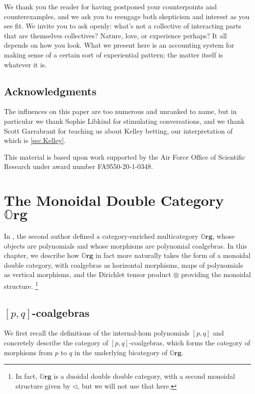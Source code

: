 \documentclass[11pt, one side, article]{memoir}
\theoremstyle{definition}
\theoremstyle{plain}
\newcommand{\Cat}[1]{\mathbf{#1}}%
\newcommand{\0}{\textsf{0}}
\newcommand{\1}{\tn{\textsf{1}}}
\newcommand{\tri}{\mathbin{\triangleleft}}
\newcommand{\org}{{\mathbb{O}\Cat{rg}}}
\begin{document}
We thank you the reader for having postponed your counterpoints and counterexamples, and we ask you to reengage both skepticism and interest as you see fit. We invite you to ask openly: what's not a collective of interacting parts that are themselves collectives? Nature, love, or experience perhaps? It all depends on how you look. What we present here is an accounting system for making sense of a certain sort of experiential pattern; the matter itself is whatever it is.

\section{Acknowledgments}

The influences on this paper are too numerous and unranked to name, but in particular we thank Sophie Libkind for stimulating conversations, and we thank Scott Garrabrant for teaching us about Kelley betting, our interpretation of which is \cref{sec.Kelley}.

This material is based upon work supported by the Air Force Office of Scientific Research under award number FA9550-20-1-0348.


\chapter{The Monoidal Double Category $\org$}\label{chap.org}

In \cite{spivak2021learners}, the second author defined a category-enriched multicategory $\org$, whose objects are polynomials and whose morphisms are polynomial coalgebras. In this chapter, we describe how $\org$ in fact more naturally takes the form of a monoidal double category, with coalgebras as horizontal morphisms, maps of polynomials as vertical morphisms, and the Dirichlet tensor product $\otimes$ providing the monoidal structure.%
\footnote{In fact, $\org$ is a duoidal double double category, with a second monoidal structure given by $\tri$, but we will not use that here.}


\section{$[p,q]$-coalgebras}


We first recall the definitions of the internal-hom polynomials $[p,q]$ and concretely describe the category of $[p,q]$-coalgebras, which forms the category of morphisms from $p$ to $q$ in the underlying bicategory of $\org$.
\end{document}
